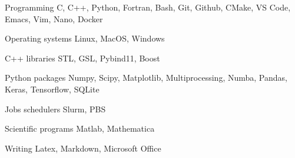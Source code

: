 

\begin{cvskills}

    \cvskill
        {Programming} %
        {C, C++, Python, Fortran, Bash, Git, Github, CMake, VS Code, Emacs, Vim, Nano, Docker} %

    \cvskill
        {Operating systems} %
        {Linux, MacOS, Windows} %

    \cvskill
        {C++ libraries} %
        {STL, GSL, Pybind11, Boost}
    

    \cvskill
        {Python packages} %
        {Numpy, Scipy, Matplotlib, Multiprocessing, Numba, Pandas, Keras, Tensorflow, SQLite}

        \cvskill
        {Jobs schedulers} %
        {Slurm, PBS}
    
    \cvskill
        {Scientific programs} %
        {Matlab, Mathematica} %


    \cvskill
        {Writing} %
        {Latex, Markdown, Microsoft Office} %

\end{cvskills}